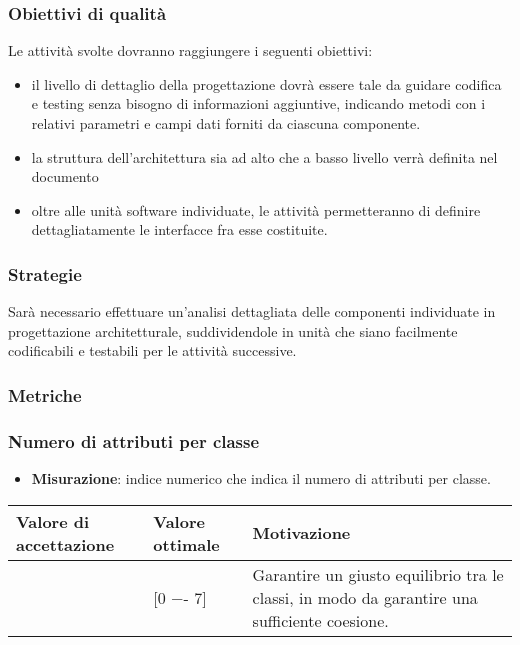 \subsubsection{Obiettivi di qualità}
Le attività svolte dovranno raggiungere i seguenti obiettivi:
\begin{itemize}
\item il livello di dettaglio della progettazione dovrà essere tale da guidare codifica e testing senza bisogno di informazioni aggiuntive, indicando metodi con i relativi parametri e campi dati forniti da ciascuna componente.
\item la struttura dell'architettura sia ad alto che a basso livello verrà definita nel documento \DDP
\item oltre alle unità software individuate, le attività permetteranno di definire dettagliatamente le interfacce fra esse costituite.
\end{itemize}

\subsubsection{Strategie}

Sarà necessario effettuare un'analisi dettagliata delle componenti individuate in progettazione architetturale, suddividendole in unità che siano facilmente codificabili e testabili per le attività successive.

\subsubsection{Metriche}

\subsubsection{Numero di attributi per classe}

\begin{itemize}
\item \textbf{Misurazione}: indice numerico che indica il numero di attributi per classe.
\end{itemize}

\begin{center}
		\begin{tabular}{|P{2.5cm}|P{2.5cm}|P{6cm}|}
		\hline
			\textbf{Valore di accettazione}	& \textbf{Valore ottimale} & \textbf{Motivazione} \\
			\hline
			[0 −- 11] & [0 −- 7] &	Garantire un giusto equilibrio tra le classi, in modo da garantire una sufficiente coesione. \\
			\hline
			\end{tabular}
\end{center}

